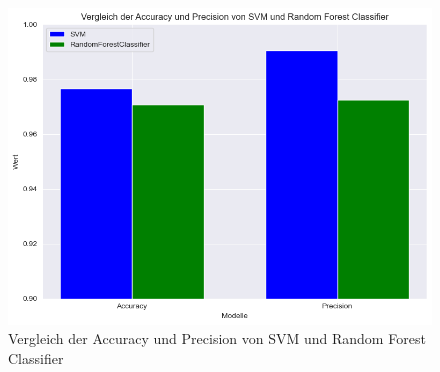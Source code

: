 \documentclass[a4paper,12pt]{article}
\begin{document}
\begin{figure}[H]
    \centering
    \includegraphics[width=\textwidth]{vergleich.png}
    \caption{Vergleich der Accuracy und Precision von SVM und Random Forest Classifier}
    \label{fig:vergleich}
\end{figure}
\end{document}
